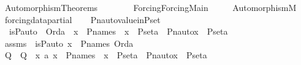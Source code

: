 %
\begin{isabellebody}%
%
%
\isadelimtheory
%
\endisadelimtheory
%
\isatagtheory
{}\isamarkupfalse%
\ Automorphism{\isacharunderscore}{\kern0pt}Theorems\isanewline
\ \ \ \isanewline
\ \ \ \ {\isachardoublequoteopen}Forcing{\isacharslash}{\kern0pt}Forcing{\isacharunderscore}{\kern0pt}Main{\isachardoublequoteclose}\ \isanewline
\ \ \ \ Automorphism{\isacharunderscore}{\kern0pt}M\isanewline
{}%
\endisatagtheory
{\isafoldtheory}%
%
\isadelimtheory
\ \isanewline
%
\endisadelimtheory
\isanewline
{}\isamarkupfalse%
\ forcing{\isacharunderscore}{\kern0pt}data{\isacharunderscore}{\kern0pt}partial\ \isanewline
{}\ \isanewline
\isanewline
{}\isamarkupfalse%
\ Pn{\isacharunderscore}{\kern0pt}auto{\isacharunderscore}{\kern0pt}value{\isacharunderscore}{\kern0pt}in{\isacharunderscore}{\kern0pt}P{\isacharunderscore}{\kern0pt}set\ {\isacharcolon}{\kern0pt}\ \isanewline
\ \ {\isachardoublequoteopen}is{\isacharunderscore}{\kern0pt}P{\isacharunderscore}{\kern0pt}auto{\isacharparenleft}{\kern0pt}{\isasympi}{\isacharparenright}{\kern0pt}\ {\isasymLongrightarrow}\ Ord{\isacharparenleft}{\kern0pt}a{\isacharparenright}{\kern0pt}\ {\isasymLongrightarrow}\ x\ {\isasymin}\ P{\isacharunderscore}{\kern0pt}names\ {\isasymLongrightarrow}\ {\isacharparenleft}{\kern0pt}x\ {\isasymin}\ P{\isacharunderscore}{\kern0pt}set{\isacharparenleft}{\kern0pt}a{\isacharparenright}{\kern0pt}\ {\isasymlongleftrightarrow}\ Pn{\isacharunderscore}{\kern0pt}auto{\isacharparenleft}{\kern0pt}{\isasympi}{\isacharparenright}{\kern0pt}{\isacharbackquote}{\kern0pt}x\ {\isasymin}\ P{\isacharunderscore}{\kern0pt}set{\isacharparenleft}{\kern0pt}a{\isacharparenright}{\kern0pt}{\isacharparenright}{\kern0pt}{\isachardoublequoteclose}\ \isanewline
%
\isadelimproof
%
\endisadelimproof
%
\isatagproof
{}\isamarkupfalse%
\ {\isacharminus}{\kern0pt}\ \isanewline
\ \ \isamarkupfalse%
\ assms\ {\isacharcolon}{\kern0pt}\ {\isachardoublequoteopen}is{\isacharunderscore}{\kern0pt}P{\isacharunderscore}{\kern0pt}auto{\isacharparenleft}{\kern0pt}{\isasympi}{\isacharparenright}{\kern0pt}{\isachardoublequoteclose}\ {\isachardoublequoteopen}x\ {\isasymin}\ P{\isacharunderscore}{\kern0pt}names{\isachardoublequoteclose}\ {\isachardoublequoteopen}Ord{\isacharparenleft}{\kern0pt}a{\isacharparenright}{\kern0pt}{\isachardoublequoteclose}\isanewline
\ \ \isamarkupfalse%
\ Q\ \ {\isachardoublequoteopen}Q\ {\isasymequiv}\ {\isasymlambda}x\ a{\isachardot}{\kern0pt}\ x\ {\isasymin}\ P{\isacharunderscore}{\kern0pt}names\ {\isasymlongrightarrow}\ {\isacharparenleft}{\kern0pt}x\ {\isasymin}\ P{\isacharunderscore}{\kern0pt}set{\isacharparenleft}{\kern0pt}a{\isacharparenright}{\kern0pt}\ {\isasymlongleftrightarrow}\ Pn{\isacharunderscore}{\kern0pt}auto{\isacharparenleft}{\kern0pt}{\isasympi}{\isacharparenright}{\kern0pt}{\isacharbackquote}{\kern0pt}x\ {\isasymin}\ P{\isacharunderscore}{\kern0pt}set{\isacharparenleft}{\kern0pt}a{\isacharparenright}{\kern0pt}{\isacharparenright}{\kern0pt}{\isachardoublequoteclose}\ \isanewline

\end{isabellebody}

